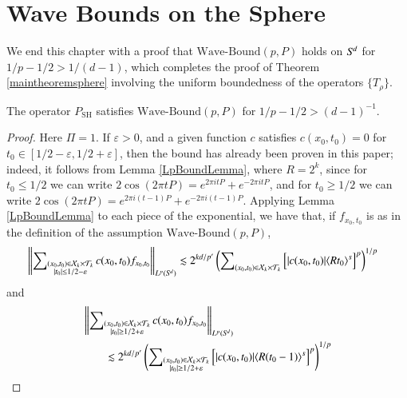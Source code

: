 \section{Wave Bounds on the Sphere}

We end this chapter with a proof that $\text{Wave-Bound}(p,P)$ holds on ${S}^{\!{d}}$ for $1/p - 1/2 > 1/(d-1)$, which completes the proof of Theorem \ref{maintheoremsphere} involving the uniform boundedness of the operators $\{ T_\rho \}$.

\begin{lemma} \label{lemdoiajoidjwaio13123}
    The operator $P_{\text{SH}}$ satisfies $\text{Wave-Bound}(p,P)$ for $1/p - 1/2 > (d-1)^{-1}$.
\end{lemma}
\begin{proof}
    Here $\Pi = 1$. If $\varepsilon > 0$, and a given function $c$ satisfies $c(x_0,t_0) = 0$ for $t_0 \in [1/2 - \varepsilon, 1/2 + \varepsilon]$, then the bound has already been proven in this paper; indeed, it follows from Lemma \ref{LpBoundLemma}, where $R = 2^k$, since for $t_0 \leq 1/2$ we can write $2 \cos(2 \pi t P) = e^{2 \pi i t P} + e^{-2 \pi i t P}$, and for $t_0 \geq 1/2$ we can write $2 \cos(2 \pi t P) = e^{2 \pi i (t - 1) P} + e^{-2 \pi i (t - 1) P}$. Applying Lemma \ref{LpBoundLemma} to each piece of the exponential, we have that, if $f_{x_0,t_0}$ is as in the definition of the assumption $\text{Wave-Bound}(p,P)$,
    \begin{equation}
    \begin{split}
        &\left\| \sum\nolimits_{\substack{(x_0,t_0) \in \mathcal{X}_k \times \mathcal{T}_k\\|t_0| \leq 1/2 - \varepsilon}} c(x_0,t_0) f_{x_0,t_0} \right\|_{L^p({S}^{\!{d}})} \lesssim 2^{kd/p'} \left( \sum\nolimits_{(x_0,t_0) \in \mathcal{X}_k \times \mathcal{T}_k} \Big[ |c(x_0,t_0)| \langle R t_0 \rangle^{s} \Big]^p \right)^{1/p}
    \end{split}
    \end{equation}
    and
    \begin{equation}
    \begin{split}
        &\left\| \sum\nolimits_{\substack{(x_0,t_0) \in \mathcal{X}_k \times \mathcal{T}_k\\|t_0| \geq 1/2 + \varepsilon}} c(x_0,t_0) f_{x_0,t_0} \right\|_{L^p(\Sd{d})} \\
        &\quad\quad \lesssim 2^{kd/p'} \left( \sum\nolimits_{\substack{(x_0,t_0) \in \mathcal{X}_k \times \mathcal{T}_k\\|t_0| \geq 1/2 + \varepsilon}} \Big[ |c(x_0,t_0)| \langle R (t_0 - 1) \rangle^{s} \Big]^p \right)^{1/p}\\

\end{split}
\end{equation}
\end{proof}
